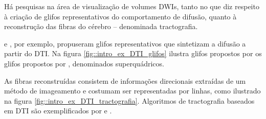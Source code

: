 \documentclass[
    12pt,                %
    oneside,            %
    a4paper,            %
    english,            %
    french,                %
    spanish,            %
    brazil                %
    ]{abntex2}
\begin{document}
Há pesquisas na área de visualização de volumes DWIs, tanto no que diz respeito à criação de glifos representativos do comportamento de difusão, quanto à reconstrução das fibras do cérebro -- denominada tractografia.

 e , por exemplo, propuseram glifos representativos que sintetizam a difusão a partir do DTI. Na figura \ref{fig::intro_ex_DTI_glifos} ilustra glifos propostos por os glifos propostos por , denominados superquádricos.

As fibras reconstruídas consistem de informações direcionais extraídas de um método de imageamento e costumam ser representadas por linhas, como ilustrado na figura \ref{fig::intro_ex_DTI_tractografia}. Algoritmos de tractografia baseados em DTI são exemplificados por  e . 
\end{document}
